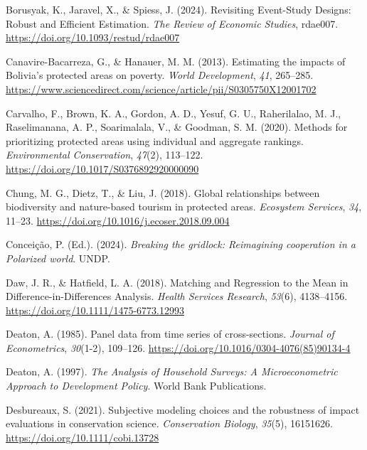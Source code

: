 \documentclass[
]{article}
\newlength{\cslhangindent}
\newenvironment{CSLReferences}[2] %
 {\begin{list}{}{%
  \setlength{\itemindent}{0pt}
  \setlength{\leftmargin}{0pt}
  \setlength{\parsep}{0pt}
  \ifodd #1
   \setlength{\leftmargin}{\cslhangindent}
   \setlength{\itemindent}{-1\cslhangindent}
  \fi
  \setlength{\itemsep}{#2\baselineskip}}}
 {\end{list}}
\begin{document}
\begin{CSLReferences}{1}{0}
Borusyak, K., Jaravel, X., \& Spiess, J. (2024). Revisiting
{Event}-{Study} {Designs}: {Robust} and {Efficient} {Estimation}.
\emph{The Review of Economic Studies}, rdae007.
\url{https://doi.org/10.1093/restud/rdae007}

Canavire-Bacarreza, G., \& Hanauer, M. M. (2013). Estimating the impacts
of {Bolivia}'s protected areas on poverty. \emph{World Development},
\emph{41}, 265--285.
\url{https://www.sciencedirect.com/science/article/pii/S0305750X12001702}

Carvalho, F., Brown, K. A., Gordon, A. D., Yesuf, G. U., Raherilalao, M.
J., Raselimanana, A. P., Soarimalala, V., \& Goodman, S. M. (2020).
Methods for prioritizing protected areas using individual and aggregate
rankings. \emph{Environmental Conservation}, \emph{47}(2), 113--122.
\url{https://doi.org/10.1017/S0376892920000090}

Chung, M. G., Dietz, T., \& Liu, J. (2018). Global relationships between
biodiversity and nature-based tourism in protected areas.
\emph{Ecosystem Services}, \emph{34}, 11--23.
\url{https://doi.org/10.1016/j.ecoser.2018.09.004}

Conceição, P. (Ed.). (2024). \emph{Breaking the gridlock: {Reimagining}
cooperation in a {Polarized} world}. UNDP.

Daw, J. R., \& Hatfield, L. A. (2018). Matching and {Regression} to the
{Mean} in {Difference}-in-{Differences} {Analysis}. \emph{Health
Services Research}, \emph{53}(6), 4138--4156.
\url{https://doi.org/10.1111/1475-6773.12993}

Deaton, A. (1985). Panel data from time series of cross-sections.
\emph{Journal of Econometrics}, \emph{30}(1-2), 109--126.
\url{https://doi.org/10.1016/0304-4076(85)90134-4}

Deaton, A. (1997). \emph{The {Analysis} of {Household} {Surveys}: {A}
{Microeconometric} {Approach} to {Development} {Policy}}. World Bank
Publications.

Desbureaux, S. (2021). Subjective modeling choices and the robustness of
impact evaluations in conservation science. \emph{Conservation Biology},
\emph{35}(5), 16151626. \url{https://doi.org/10.1111/cobi.13728}


\end{CSLReferences}
\end{document}
